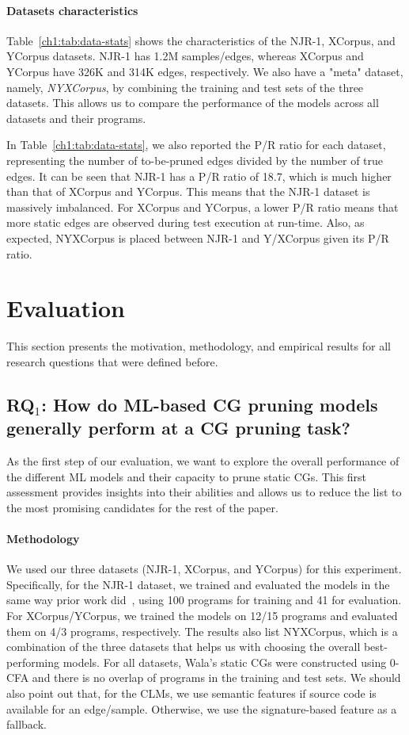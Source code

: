 \paragraph{Datasets characteristics} Table~\ref{ch1:tab:data-stats} shows the characteristics of the NJR-1, XCorpus, and YCorpus datasets. NJR-1 has 1.2M samples/edges, whereas XCorpus and YCorpus have 326K and 314K edges, respectively. We also have a "meta" dataset, namely, \textit{NYXCorpus}, by combining the training and test sets of the three datasets. This allows us to compare the performance of the models across all datasets and their programs.

In Table~\ref{ch1:tab:data-stats}, we also reported the P/R ratio for each dataset, representing the number of to-be-pruned edges divided by the number of true edges. It can be seen that NJR-1 has a P/R ratio of 18.7, which is much higher than that of XCorpus and YCorpus. This means that the NJR-1 dataset is massively imbalanced. For XCorpus and YCorpus, a lower P/R ratio means that more static edges are observed during test execution at run-time. Also, as expected, NYXCorpus is placed between NJR-1 and Y/XCorpus given its P/R ratio.

\section{Evaluation}\label{ch1:sec:eval}
This section presents the motivation, methodology, and empirical results for all research questions that were defined before. 

\subsection{\textbf{RQ}$_{1}$: How do ML-based CG pruning models generally perform at a CG pruning task?}
As the first step of our evaluation, we want to explore the overall performance of the different ML models and their capacity to prune static CGs.
This first assessment provides insights into their abilities and allows us to reduce the list to the most promising candidates for the rest of the paper.
 
\paragraph{Methodology} We used our three datasets (NJR-1, XCorpus, and YCorpus) for this experiment.
Specifically, for the NJR-1 dataset, we trained and evaluated the models in the same way prior work did~\cite{utture2022striking}, using 100 programs for training and 41 for evaluation.
For XCorpus/YCorpus, we trained the models on 12/15 programs and evaluated them on 4/3 programs, respectively.
The results also list NYXCorpus, which is a combination of the three datasets that helps us with choosing the overall best-performing models.
For all datasets, Wala's static CGs were constructed using 0-CFA and there is no overlap of programs in the training and test sets. We should also point out that, for the CLMs, we use semantic features if source code is available for an edge/sample. Otherwise, we use the signature-based feature as a fallback.

